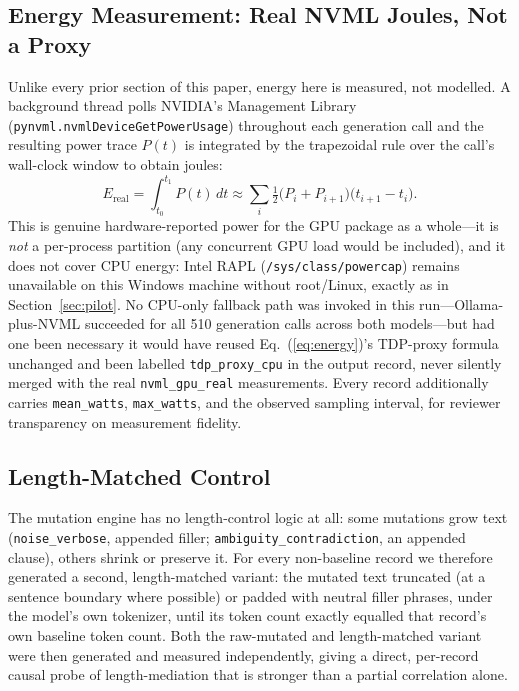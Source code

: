 \documentclass[conference]{IEEEtran}
\begin{document}
\subsection{Energy Measurement: Real NVML Joules, Not a Proxy}
\label{sec:real-energy}
Unlike every prior section of this paper, energy here is measured,
not modelled. A background thread polls NVIDIA's Management Library
(\texttt{pynvml.nvmlDeviceGetPowerUsage}) throughout each generation
call and the resulting power trace $P(t)$ is integrated by the
trapezoidal rule over the call's wall-clock window to obtain joules:
\begin{equation}
  E_\text{real} = \int_{t_0}^{t_1} P(t)\,dt \approx
  \sum_i \tfrac{1}{2}\big(P_i + P_{i+1}\big)\big(t_{i+1}-t_i\big).
  \label{eq:nvml}
\end{equation}
This is genuine hardware-reported power for the GPU package as a
whole---it is \emph{not} a per-process partition (any concurrent GPU
load would be included), and it does not cover CPU energy: Intel RAPL
(\texttt{/sys/class/powercap}) remains unavailable on this Windows
machine without root/Linux, exactly as in Section~\ref{sec:pilot}. No
CPU-only fallback path was invoked in this run---Ollama-plus-NVML
succeeded for all 510 generation calls across both models---but had
one been necessary it would have reused Eq.~(\ref{eq:energy})'s
TDP-proxy formula unchanged and been labelled \texttt{tdp\_proxy\_cpu}
in the output record, never silently merged with the real
\texttt{nvml\_gpu\_real} measurements. Every record additionally
carries \texttt{mean\_watts}, \texttt{max\_watts}, and the observed
sampling interval, for reviewer transparency on measurement fidelity.
\subsection{Length-Matched Control}
\label{sec:real-length}
The mutation engine has no length-control logic at all: some
mutations grow text (\texttt{noise\_verbose}, appended filler;
\texttt{ambiguity\_contradiction}, an appended clause), others
shrink or preserve it. For every non-baseline record we therefore
generated a second, length-matched variant: the mutated text
truncated (at a sentence boundary where possible) or padded with
neutral filler phrases, under the model's own tokenizer, until its
token count exactly equalled that record's own baseline token count.
Both the raw-mutated and length-matched variant were then generated
and measured independently, giving a direct, per-record causal probe
of length-mediation that is stronger than a partial correlation alone.
\end{document}
